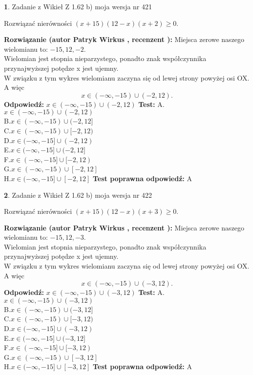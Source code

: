 \documentclass[12pt, a4paper]{article}
\theoremstyle{definition} %
\newtheorem{zad}{}
\newcommand{\zadStart}[1]{\begin{zad}#1\newline}
\newcommand{\zadStop}{\end{zad}}
\newcommand{\rozwStart}[2]{\noindent \textbf{Rozwiązanie (autor #1 , recenzent #2): }\newline}
\newcommand{\rozwStop}{\newline}
\newcommand{\odpStart}{\noindent \textbf{Odpowiedź:}\newline}
\newcommand{\odpStop}{\newline}
\newcommand{\testStart}{\noindent \textbf{Test:}\newline}
\newcommand{\testStop}{\newline}
\newcommand{\kluczStart}{\noindent \textbf{Test poprawna odpowiedź:}\newline}
\newcommand{\kluczStop}{\newline}
\begin{document}
\zadStart{Zadanie z Wikieł Z 1.62 b) moja wersja nr 421}

Rozwiązać nierówności $(x+15)(12-x)(x+2)\ge0$.
\zadStop
\rozwStart{Patryk Wirkus}{}
Miejsca zerowe naszego wielomianu to: $-15, 12, -2$.\\
Wielomian jest stopnia nieparzystego, ponadto znak współczynnika przy\linebreak najwyższej potędze x jest ujemny.\\ W związku z tym wykres wielomianu zaczyna się od lewej strony powyżej osi OX. A więc $$x \in (-\infty,-15) \cup (-2,12).$$
\rozwStop
\odpStart
$x \in (-\infty,-15) \cup (-2,12)$
\odpStop
\testStart
A.$x \in (-\infty,-15) \cup (-2,12)$\\
B.$x \in (-\infty,-15) \cup (-2,12]$\\
C.$x \in (-\infty,-15) \cup [-2,12)$\\
D.$x \in (-\infty,-15] \cup (-2,12)$\\
E.$x \in (-\infty,-15] \cup (-2,12]$\\
F.$x \in (-\infty,-15] \cup [-2,12)$\\
G.$x \in (-\infty,-15) \cup [-2,12]$\\
H.$x \in (-\infty,-15] \cup [-2,12]$
\testStop
\kluczStart
A
\kluczStop



\zadStart{Zadanie z Wikieł Z 1.62 b) moja wersja nr 422}

Rozwiązać nierówności $(x+15)(12-x)(x+3)\ge0$.
\zadStop
\rozwStart{Patryk Wirkus}{}
Miejsca zerowe naszego wielomianu to: $-15, 12, -3$.\\
Wielomian jest stopnia nieparzystego, ponadto znak współczynnika przy\linebreak najwyższej potędze x jest ujemny.\\ W związku z tym wykres wielomianu zaczyna się od lewej strony powyżej osi OX. A więc $$x \in (-\infty,-15) \cup (-3,12).$$
\rozwStop
\odpStart
$x \in (-\infty,-15) \cup (-3,12)$
\odpStop
\testStart
A.$x \in (-\infty,-15) \cup (-3,12)$\\
B.$x \in (-\infty,-15) \cup (-3,12]$\\
C.$x \in (-\infty,-15) \cup [-3,12)$\\
D.$x \in (-\infty,-15] \cup (-3,12)$\\
E.$x \in (-\infty,-15] \cup (-3,12]$\\
F.$x \in (-\infty,-15] \cup [-3,12)$\\
G.$x \in (-\infty,-15) \cup [-3,12]$\\
H.$x \in (-\infty,-15] \cup [-3,12]$
\testStop
\kluczStart
A
\kluczStop
\end{document}
